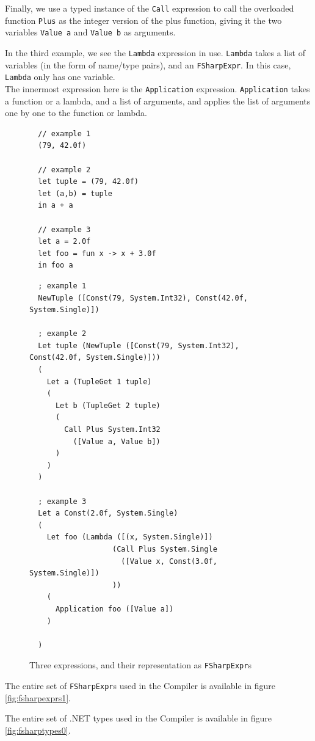 Finally, we use a typed instance of the \texttt{Call} expression to call the
overloaded function \texttt{Plus} as the integer version of the plus function,
giving it the two variables \texttt{Value a} and \texttt{Value b} as arguments.

In the third example, we see the \texttt{Lambda} expression in use. \texttt{Lambda} takes
a list of variables (in the form of name/type pairs), and an \texttt{FSharpExpr}. In this case,
\texttt{Lambda} only has one variable.\\
The innermost expression here is the \texttt{Application} expression.
\texttt{Application} takes a function or a lambda, and a list of arguments, and
applies the list of arguments one by one to the function or lambda.

\begin{figure}[H]
  \centering
\begin{verbatim}
  // example 1
  (79, 42.0f)

  // example 2
  let tuple = (79, 42.0f)
  let (a,b) = tuple
  in a + a

  // example 3
  let a = 2.0f
  let foo = fun x -> x + 3.0f
  in foo a
\end{verbatim}

\begin{verbatim}
  ; example 1
  NewTuple ([Const(79, System.Int32), Const(42.0f, System.Single)])

  ; example 2
  Let tuple (NewTuple ([Const(79, System.Int32), Const(42.0f, System.Single)]))
  ( 
    Let a (TupleGet 1 tuple) 
    (
      Let b (TupleGet 2 tuple) 
      (
        Call Plus System.Int32 
          ([Value a, Value b])
      )       
    )
  )

  ; example 3
  Let a Const(2.0f, System.Single)
  (
    Let foo (Lambda ([(x, System.Single)]) 
                   (Call Plus System.Single 
                     ([Value x, Const(3.0f, System.Single)])
                   ))
    (
      Application foo ([Value a])
    )

  )
\end{verbatim}
  \caption{Three \fsharp{} expressions, and their representation as
    \texttt{FSharpExpr}s}
  \label{fig:fsharpexprs0}
\end{figure}

The entire set of \texttt{FSharpExpr}s used in the \fshark{}Compiler is
available in figure \ref{fig:fsharpexprs1}.

The entire set of .NET types used in the \fshark{}Compiler is
available in figure \ref{fig:fsharptypes0}.

